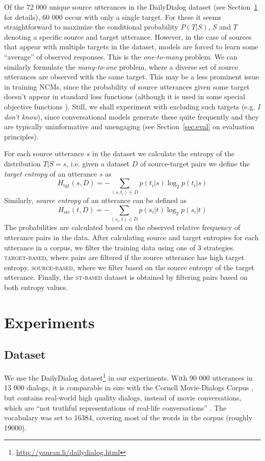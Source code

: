 \documentclass[11pt,a4paper]{article}
\begin{document}
Of the 72 000 unique source utterances in the
DailyDialog dataset (see Section~\ref{sec:experiments} for details),
60 000 occur with only a single target. For these it seems
straightforward to maximize the conditional probability $P(T|S)$, $S$ and $T$ denoting
a specific source and target utterance.
However, in the case of sources that appear with multiple targets in the dataset,
models are forced to learn some ``average'' of
observed responses. This is the \textit{one-to-many} problem.
We can similarly formulate the \textit{many-to-one}
problem, where a diverse set of source utterances are observed with the
same target. This may be a less prominent issue in training NCMs,
since the probability of source utterances given some target
doesn't appear in standard loss functions (although it is used
in some special objective functions \cite{Li:2015c}). Still, we shall
experiment with excluding such targets (e.g. \textit{I don't know}),
since conversational models generate these quite frequently and they are
typically uninformative and unengaging (see Section~\ref{sec:eval} on
evaluation principles).

For each source utterance $s$ in the dataset we calculate the entropy
of the distribution $T|S=s$, i.e. given a dataset $D$ of source-target
pairs we define the
\textit{target entropy} of an utterance $s$ as 
\[ H_{\text{tgt}}(s, D) = - \sum_{(s, t_i)\in D} p(t_i|s)\log_2 p(t_i|s)
\]
Similarly, \textit{source entropy} of an utterance can be defined as
\[ H_{\text{src}}(t, D) = - \sum_{(s_i, t)\in D} p(s_i|t)\log_2 p(s_i|t)
\]
The probabilities are calculated based on the observed relative frequency of utterance pairs in the data. After calculating source and target entropies for each utterance in a
corpus, we filter the training data using one of 3 strategies. \textsc{target-based}, where pairs are filtered if the source utterance
has high target entropy. \textsc{source-based}, where
we filter based on the source entropy of the target utterance.
Finally, the \textsc{st-based} dataset is obtained by filtering pairs based on
both entropy values.


\section{Experiments}
\label{sec:experiments}

\subsection{Dataset}
We use the DailyDialog
dataset\footnote{\url{http://yanran.li/dailydialog.html}} \cite{Li:2017b} in
our experiments. With 90 000 utterances in 13 000 dialogs, it is comparable in size
  with the Cornell Movie-Dialogs Corpus
\cite{Danescu:2011}, but contains real-world high quality dialogs, instead
of movie conversations, which are ``not truthful representations of real-life
conversations'' \cite{Danescu:2011}. The vocabulary was set to 16384, covering most of the words in the corpus (roughly 19000).
\end{document}
